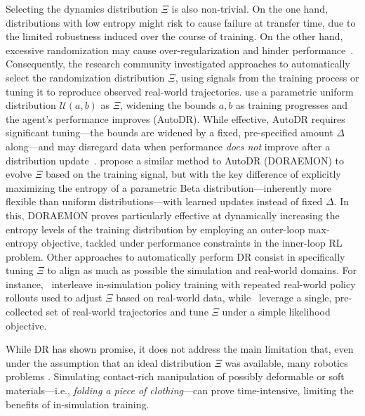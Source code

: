 Selecting the dynamics distribution \( \Xi \) is also non-trivial.
On the one hand, distributions with low entropy might risk to cause failure at transfer time, due to the limited robustness induced over the course of training.
On the other hand, excessive randomization may cause over-regularization and hinder performance~\citep{margolisRapidLocomotionReinforcement2022}.
Consequently, the research community investigated approaches to automatically select the randomization distribution \( \Xi \), using signals from the training process or tuning it to reproduce observed real-world trajectories.
\citet{akkayaSolvingRubiksCube2019} use a parametric uniform distribution \( \mathcal U(a, b) \) as \( \Xi \), widening the bounds \( a, b \) as training progresses and the agent's performance improves (AutoDR).
While effective, AutoDR requires significant tuning---the bounds are widened by a fixed, pre-specified amount \( \Delta \) along---and may disregard data when performance \emph{does not} improve after a distribution update~\citep{tiboniDomainRandomizationEntropy2024}. \citet{tiboniDomainRandomizationEntropy2024} propose a similar method to AutoDR (DORAEMON) to evolve \( \Xi \) based on the training signal, but with the key difference of explicitly maximizing the entropy of a parametric Beta distribution---inherently more flexible than uniform distributions---with learned updates instead of fixed \( \Delta \).
In this, DORAEMON proves particularly effective at dynamically increasing the entropy levels of the training distribution by employing an outer-loop max-entropy objective, tackled under performance constraints in the inner-loop RL problem.
Other approaches to automatically perform DR consist in specifically tuning \( \Xi \) to align as much as possible the simulation and real-world domains.
For instance,~\citet{chebotarClosingSimtorealLoop2019} interleave in-simulation policy training with repeated real-world policy rollouts used to adjust \( \Xi \) based on real-world data, while~\citet{tiboniDROPOSimtoRealTransfer2023} leverage a single, pre-collected set of real-world trajectories and tune \( \Xi \) under a simple likelihood objective.

While DR has shown promise, it does not address the main limitation that, even under the assumption that an ideal distribution \( \Xi \) was available, many robotics problems .
Simulating contact-rich manipulation of possibly deformable or soft materials---i.e., \emph{folding a piece of clothing}---can prove time-intensive, limiting the benefits of in-simulation training.

